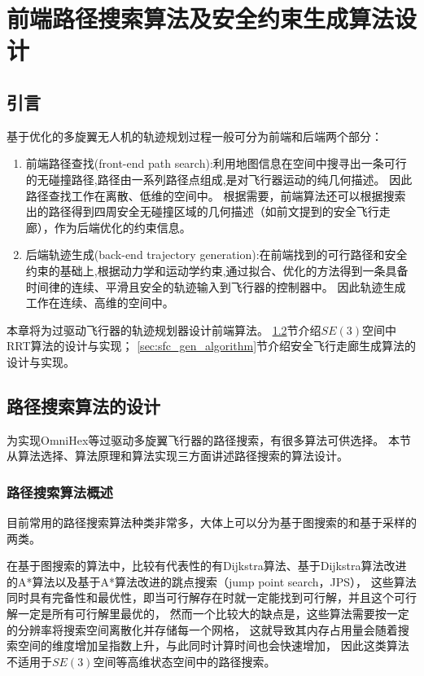 
\chapter{前端路径搜索算法及安全约束生成算法设计}\label{chap:front_end_algorithm}

\section{引言}\label{sec:intro_3}
基于优化的多旋翼无人机的轨迹规划过程一般可分为前端和后端两个部分：
\begin{enumerate}
  \renewcommand{\labelenumi}{(\theenumi)}
  \item 前端路径查找(front-end path search):利用地图信息在空间中搜寻出一条可行的无碰撞路径,路径由一系列路径点组成,是对飞行器运动的纯几何描述。
        因此路径查找工作在离散、低维的空间中。
        根据需要，前端算法还可以根据搜索出的路径得到四周安全无碰撞区域的几何描述（如前文提到的安全飞行走廊），作为后端优化的约束信息。
  \item 后端轨迹生成(back-end trajectory generation):在前端找到的可行路径和安全约束的基础上,根据动力学和运动学约束,通过拟合、优化的方法得到一条具备时间律的连续、平滑且安全的轨迹输入到飞行器的控制器中。
        因此轨迹生成工作在连续、高维的空间中。
\end{enumerate}

本章将为过驱动飞行器的轨迹规划器设计前端算法。
\ref{sec:search_algorithm}节介绍$SE(3)$空间中RRT算法的设计与实现；
\ref{sec:sfc_gen_algorithm}节介绍安全飞行走廊生成算法的设计与实现。

\section{路径搜索算法的设计}\label{sec:search_algorithm}
为实现OmniHex等过驱动多旋翼飞行器的路径搜索，有很多算法可供选择。
本节从算法选择、算法原理和算法实现三方面讲述路径搜索的算法设计。
\subsection{路径搜索算法概述}\label{subsec:path_search_overview}
目前常用的路径搜索算法种类非常多，大体上可以分为基于图搜索的和基于采样的两类。

在基于图搜索的算法中，比较有代表性的有Dijkstra算法、基于Dijkstra算法改进的A*算法\cite{hart1968formal}以及基于A*算法改进的跳点搜索（jump point search，JPS）\cite{harabor2011online}，
这些算法同时具有完备性和最优性，即当可行解存在时就一定能找到可行解，并且这个可行解一定是所有可行解里最优的，
然而一个比较大的缺点是，这些算法需要按一定的分辨率将搜索空间离散化并存储每一个网格，
这就导致其内存占用量会随着搜索空间的维度增加呈指数上升，与此同时计算时间也会快速增加，
因此这类算法不适用于$SE(3)$空间等高维状态空间中的路径搜索。

